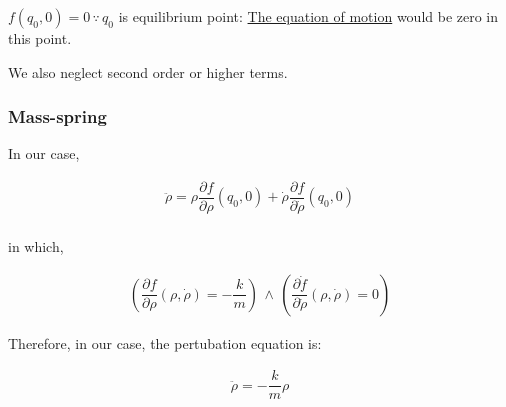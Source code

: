 \documentclass[12pt]{article}
\begin{document}
\(f(q_0,0)=0\, \because\, q_0\) is equilibrium point: \hyperref[sec:org8302932]{The equation of motion} would be zero in this point.

We also neglect second order or higher terms.

\subsubsection{Mass-spring}
\label{sec:orga71c2f8}
In our case,

\begin{equation}
\begin{aligned}
\ddot{\rho} = \rho \dfrac{\partial{f}}{\partial{\rho}}(q_0,0) + \dot{\rho} \dfrac{\partial{f}}{\partial{\dot{\rho}}}(q_0,0)\\
\end{aligned}
\end{equation}

in which,

\begin{equation}
\begin{aligned}
\left(\dfrac{\partial{f}}{\partial{\rho}}(\rho,\dot{\rho})
=- \dfrac{k}{m}\right) \, \land \, \left(\dfrac{\partial{\dot{f}}}{\partial{\dot{\rho}}}(\rho,\dot{\rho})=0\right)
\end{aligned}
\end{equation}

Therefore, in our case, the pertubation equation is:

\begin{equation}
\begin{aligned}
\ddot{\rho} = - \dfrac{k}{m}\rho
\end{aligned}
\end{equation}
\end{document}
